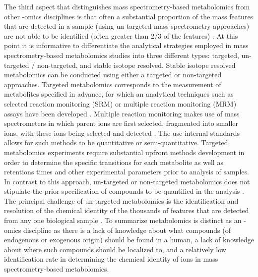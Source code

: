 \begin{DoubleSpace*}
The third aspect that distinguishes mass spectrometry-based metabolomics from other -omics disciplines is that often a substantial proportion of the mass features that are detected in a sample (using un-targeted mass spectrometry approaches) are not able to be identified (often greater than 2/3 of the features) \cite{newgard2017}. At this point it is informative to differentiate the analytical strategies employed in mass spectrometry-based metabolomics studies into three different types: targeted, un-targeted / non-targeted, and stable isotope resolved. Stable isotope resolved metabolomics can be conducted using either a targeted or non-targeted approaches. Targeted metabolomics corresponds to the measurement of metabolites specified in advance, for which an analytical techniques such as selected reaction monitoring (SRM) or multiple reaction monitoring (MRM) assays have been developed \cite{roberts2012,zamboni2015}.  Multiple reaction monitoring makes use of mass spectrometers in which parent ions are first selected, fragmented into smaller ions, with these ions being selected and detected \cite{roberts2012}. The use internal standards allows for such methods to be quantitative or semi-quantitative. Targeted metabolomics experiments require substantial upfront methods development in order to determine the specific transitions for each metabolite as well as retentions times and other experimental parameters prior to analysis of samples. In contrast to this approach, un-targeted or non-targeted metabolomics does not stipulate the prior specification of compounds to be quantified in the analysis \cite{zamboni2015,putri2013,roberts2012}. The principal challenge of un-targeted metabolomics is the identification and resolution of the chemical identity of the thousands of features that are detected from any one biological sample \cite{zamboni2015}. To summarize metabolomics is distinct as an -omics discipline as there is a lack of knowledge about what compounds (of endogenous or exogenous origin) should be found in a human, a lack of knowledge about where such compounds should be localized to, and a relatively low identification rate in determining the chemical identity of ions in mass spectrometry-based metabolomics.


\end{DoubleSpace*}
